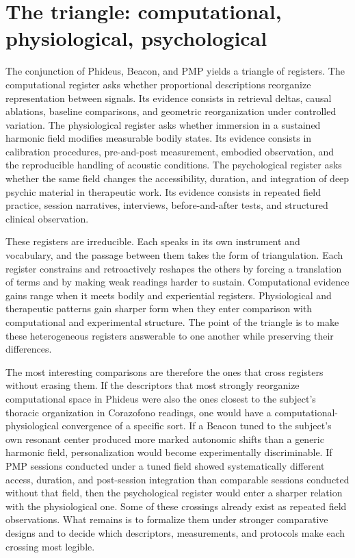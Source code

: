 \section{The triangle: computational, physiological, psychological}


The conjunction of Phideus, Beacon, and PMP yields a triangle of registers. The computational register asks whether proportional descriptions reorganize representation between signals. Its evidence consists in retrieval deltas, causal ablations, baseline comparisons, and geometric reorganization under controlled variation. The physiological register asks whether immersion in a sustained harmonic field modifies measurable bodily states. Its evidence consists in calibration procedures, pre-and-post measurement, embodied observation, and the reproducible handling of acoustic conditions. The psychological register asks whether the same field changes the accessibility, duration, and integration of deep psychic material in therapeutic work. Its evidence consists in repeated field practice, session narratives, interviews, before-and-after tests, and structured clinical observation.

These registers are irreducible. Each speaks in its own instrument and vocabulary, and the passage between them takes the form of triangulation. Each register constrains and retroactively reshapes the others by forcing a translation of terms and by making weak readings harder to sustain. Computational evidence gains range when it meets bodily and experiential registers. Physiological and therapeutic patterns gain sharper form when they enter comparison with computational and experimental structure. The point of the triangle is to make these heterogeneous registers answerable to one another while preserving their differences.

The most interesting comparisons are therefore the ones that cross registers without erasing them. If the descriptors that most strongly reorganize computational space in Phideus were also the ones closest to the subject's thoracic organization in Corazofono readings, one would have a computational-physiological convergence of a specific sort. If a Beacon tuned to the subject's own resonant center produced more marked autonomic shifts than a generic harmonic field, personalization would become experimentally discriminable. If PMP sessions conducted under a tuned field showed systematically different access, duration, and post-session integration than comparable sessions conducted without that field, then the psychological register would enter a sharper relation with the physiological one. Some of these crossings already exist as repeated field observations. What remains is to formalize them under stronger comparative designs and to decide which descriptors, measurements, and protocols make each crossing most legible.

